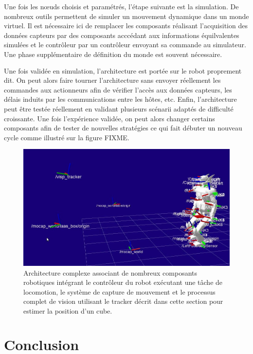 Une fois les n\oe uds choisis et paramétrés, l'étape suivante est la
simulation. De nombreux outils permettent de simuler un mouvement
dynamique dans un monde virtuel. Il est nécessaire ici de remplacer
les composants réalisant l'acquisition des données capteurs par des
composants acccédant aux informations équilvalentes simulées et le
contrôleur par un contrôleur envoyant sa commande au simulateur. Une
phase supplémentaire de définition du monde est souvent nécessaire.


Une fois validée en simulation, l'architecture est portée sur le robot
proprement dit. On peut alors faire tourner l'architecture sans
envoyer réellement les commandes aux actionneurs afin de vérifier
l'accès aux données capteurs, les délais induits par les
communications entre les hôtes, etc. Enfin, l'architecture peut être
testée réellement en validant plusieurs scénarii adaptés de difficulté
croissante. Une fois l'expérience validée, on peut alors changer
certains composants afin de tester de nouvelles stratégies ce qui fait
débuter un nouveau cycle comme illustré sur la figure FIXME.


\begin{figure}
  \begin{center}
    \includegraphics[width=.95\linewidth]{src/chap4-integration/rviz-full.jpg}
  \end{center}
  \caption{Architecture complexe associant de nombreux composants
    robotiques intégrant le contrôleur du robot exécutant une tâche de
    locomotion, le système de capture de mouvement et le processus
    complet de vision utilisant le tracker décrit dans cette section
    pour estimer la position d'un cube.}
\end{figure}



\section{Conclusion}


